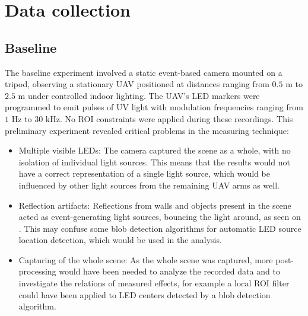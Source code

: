 \section{Data collection}

\subsection{Baseline}

The baseline experiment involved a static event-based camera mounted on a tripod, observing a stationary \ac{UAV} positioned at distances ranging from
$0.5$ m to $2.5$ m under controlled indoor lighting. The \ac{UAV}'s \ac{LED} markers were programmed to emit pulses of \ac{UV} light with modulation
frequencies ranging from $1$ Hz to $30$ kHz. No \ac{ROI} constraints were applied during these recordings.
This preliminary experiment revealed critical problems in the measuring technique:
\begin{itemize}
    \item Multiple visible \ac{LED}s: The camera captured the scene as a whole, with no isolation of individual light sources. This means that the results
    would not have a correct representation of a single light source, which would be influenced by other light sources from the remaining \ac{UAV}
    arms as well.
    \item Reflection artifacts: Reflections from walls and objects present in the scene acted as event-generating light sources, bouncing the light around,
    as seen on .
    This may confuse some blob detection algorithms for automatic \ac{LED} source location detection, which would be used in the analysis.
    \item Capturing of the whole scene: As the whole scene was captured, more post-processing would have been needed to analyze the recorded data and to investigate the relations of measured effects, for example a local \ac{ROI} filter could have been applied to \ac{LED} centers detected by a blob detection algorithm.
\end{itemize}


